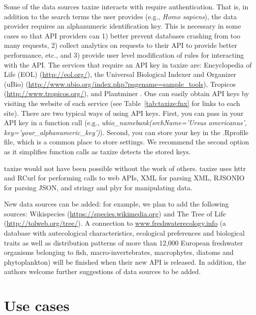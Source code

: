 \begin{sloppypar}
Some of the data sources taxize interacts with require authentication. 
That is, in addition to the search terms the user provides (e.g., \emph{Homo sapiens}), the data provider requires an alphanumeric identification key. 
This is necessary in some cases so that API providers can 1) better prevent databases crashing from too many requests, 2) collect analytics on requests to their API to provide better performance, etc., and 3) provide user level modification of rules for interacting with the API. 
The services that require an API key in taxize are: Encyclopedia of Life (EOL) (\url{http://eol.org/}), the Universal Biological Indexer and Organizer (uBio) (\url{http://www.ubio.org/index.php?pagename=sample_tools}), Tropicos (\url{http://www.tropicos.org/}), and Plantminer \citep{carvalho2010plantminer}. 
One can easily obtain API keys by visiting the website of each service (see Table~\ref{tab:taxize:fnx} for links to each site). 
There are two typical ways of using API keys. 
First, you can pass in your API key in a function call (e.g., \emph{ubio\_namebank(srchName='Ursus americanus', key='your\_alphanumeric\_key')}). 
Second, you can store your key in the .Rprofile file, which is a common place to store settings. We recommend the second option as it simplifies function calls as taxize detects the stored keys.

taxize would not have been possible without the work of others. 
taxize uses httr \citep{httr} and RCurl \citep{rcurl} for performing calls to web APIs, XML \citep{xml} for parsing XML, RJSONIO \citep{rjsonio} for parsing JSON, and stringr \citep{stringr} and plyr \citep{plyr} for manipulating data.
  
New data sources can be added: for example, we plan to add the following sources: Wikispecies (\url{https://species.wikimedia.org}) and The Tree of Life (\url{http://tolweb.org/tree/}). 
A connection to \url{www.freshwaterecology.info} (a database with autecological characteristics, ecological preferences and biological traits as well as distribution patterns of more than 12,000 European freshwater organisms belonging to fish, macro-invertebrates, macrophytes, diatoms and phytoplankton) will be finished when their new API is released. 
In addition, the authors welcome further suggestions of data sources to be added.


\clearpage
\section{Use cases}

\end{sloppypar}

